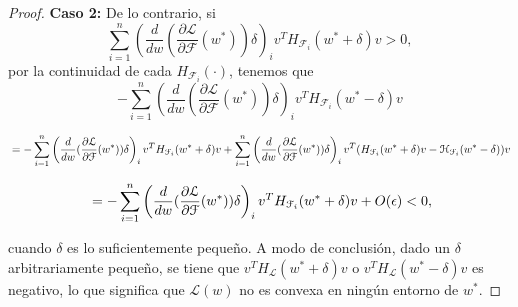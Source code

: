 \begin{proof}
    \textbf{Caso 2:} De lo contrario, si 
    \[
    \sum_{i=1}^{n} \left( \frac{d}{dw} (\frac{\partial \mathcal{L}}{\partial \mathcal{F}}(w^*))\delta \right)_i v^T H_{\mathcal{F}_i}(w^* + \delta) v > 0,
    \]
    por la continuidad de cada $H_{\mathcal{F}_i}(\cdot)$, tenemos que
    \[
        -\sum_{i=1}^{n} \left( \frac{d}{dw} (\frac{\partial \mathcal{L}}{\partial \mathcal{F}}(w^*))\delta \right)_i v^T H_{\mathcal{F}_i}(w^* - \delta) v
    \]

    \[
        \\ = -\sum_{i=1}^{n} \left( \frac{d}{dw} (\frac{\partial \mathcal{L}}{\partial \mathcal{F}}(w^*))\delta \right)_i v^T H_{\mathcal{F}_i}(w^* + \delta) v + \sum_{i=1}^{n} \left( \frac{d}{dw} (\frac{\partial \mathcal{L}}{\partial \mathcal{F}}(w^*))\delta \right)_i v^T (H_{\mathcal{F}_i}(w^* + \delta) v - \mathcal{H}_{\mathcal{F}_i}(w^* - \delta)) v
    \]

    \[
        \\ = -\sum_{i=1}^{n} \left( \frac{d}{dw} (\frac{\partial \mathcal{L}}{\partial \mathcal{F}}(w^*))\delta \right)_i v^T H_{\mathcal{F}_i}(w^* + \delta) v + O(\epsilon) < 0,
    \]
    
    cuando $\delta$ es lo suficientemente pequeño. A modo de conclusión, dado un $\delta$ arbitrariamente pequeño, se tiene que $v^T H_{\mathcal{L}}(w^* + \delta) v$ o $v^T H_{\mathcal{L}}(w^* - \delta) v$ es negativo, lo que significa que $\mathcal{L}(w)$ no es convexa en ningún entorno de $w^*$.

\end{proof}

\endinput
